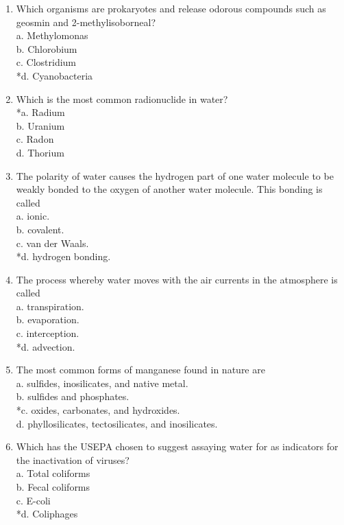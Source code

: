 \begin{enumerate}[1.]
  \item Which organisms are prokaryotes and release odorous compounds such as geosmin and 2-methylisoborneal?\\
a. Methylomonas\\
b. Chlorobium\\
c. Clostridium\\
*d. Cyanobacteria 


  \item Which is the most common radionuclide in water?\\
*a. Radium\\
b. Uranium\\
c. Radon\\
d. Thorium\\

  \item The polarity of water causes the hydrogen part of one water molecule to be weakly bonded to the oxygen of another water molecule. This bonding is called\\
a. ionic.\\
b. covalent.\\
c. van der Waals.\\
*d. hydrogen bonding. 

  \item The process whereby water moves with the air currents in the atmosphere is called\\
a. transpiration.\\
b. evaporation.\\
c. interception.\\
*d. advection.\\

  \item The most common forms of manganese found in nature are\\
a. sulfides, inosilicates, and native metal.\\
b. sulfides and phosphates.\\
*c. oxides, carbonates, and hydroxides.\\
d. phyllosilicates, tectosilicates, and inosilicates.\\

  \item Which has the USEPA chosen to suggest assaying water for as indicators for the inactivation of viruses?\\
a. Total coliforms\\
b. Fecal coliforms\\
c. E-coli\\
*d. Coliphages 


\end{enumerate}
